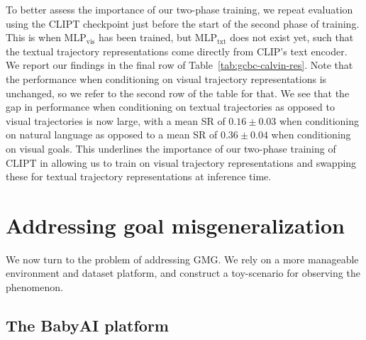 \documentclass[../main.tex]{subfiles}
\begin{document}
To better assess the importance of our two-phase training, we repeat evaluation using the CLIPT
checkpoint just before the start of the second phase of training. This is when
$\text{MLP}_\text{vis}$ has been trained, but $\text{MLP}_\text{txt}$ does not exist yet, such that
the textual trajectory representations come directly from CLIP's text encoder. We report our
findings in the final row of Table~\ref{tab:gcbc-calvin-res}. Note that the performance when
conditioning on visual trajectory representations is unchanged, so we refer to the second row of the
table for that. We see that the gap in performance when conditioning on textual trajectories as
opposed to visual trajectories is now large, with a mean SR of $0.16 \pm 0.03$ when
conditioning on natural language as opposed to a mean SR of $0.36 \pm 0.04$  when conditioning on
visual goals. This underlines the importance of our two-phase training of CLIPT in allowing us to
train on visual trajectory representations and swapping these for textual trajectory representations
at inference time.

\section{Addressing goal misgeneralization}\label{exp:sec:gmg}

We now turn to the problem of addressing GMG. We rely on a more manageable environment and dataset
platform, and construct a toy-scenario for observing the phenomenon.

\subsection{The BabyAI platform}
\end{document}
